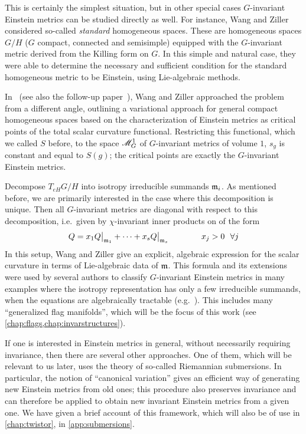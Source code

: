 This is certainly the simplest situation, but in other special cases $G$-invariant Einstein metrics can be studied directly as well. For instance, Wang and Ziller~\cite{WZ1985} considered so-called \emph{standard} homogeneous spaces. These are homogeneous spaces $G/H$ ($G$ compact, connected and semisimple) equipped with the $G$-invariant metric derived from the Killing form on $G$. In this simple and natural case, they were able to determine the necessary and sufficient condition for the standard homogeneous metric to be Einstein, using Lie-algebraic methods. 

In~\cite{WZ1986a} (see also the follow-up paper~\cite{BWZ2004}), Wang and Ziller approached the problem from a different angle, outlining a variational approach for general compact homogeneous spaces based on the characterization of Einstein metrics as critical points of the total scalar curvature functional. Restricting this functional, which we called $S$ before, to the space $\mathscr{M}_G^1$ of $G$-invariant metrics of volume $1$, $s_g$ is constant and equal to $S(g)$; the critical points are exactly the $G$-invariant Einstein metrics.

Decompose $T_{eH}G/H$ into isotropy irreducible summands $\mathfrak{m}_i$. As mentioned before, we are primarily interested in the case where this decomposition is unique. Then all $G$-invariant metrics are diagonal with respect to this decomposition, i.e.~given by $\chi$-invariant inner products on of the form
\begin{equation*}
	Q=x_1 Q\big|_{\mf m_1}+\dots+ x_s Q\big|_{\mf m_s}\qquad \qquad x_j>0\ \ \forall j
\end{equation*}
In this setup, Wang and Ziller give an explicit, algebraic expression for the scalar curvature in terms of Lie-algebraic data of $\mathfrak{m}$. This formula and its extensions were used by several authors to classify $G$-invariant Einstein metrics in many examples where the isotropy representation has only a few irreducible summands, when the equations are algebraically tractable (e.g.~\cite{Ker1996,PS1997,DK2008}). This includes many ``generalized flag manifolds'', which will be the focus of this work (see \cref{chap:flags,chap:invarstructures}).

If one is interested in Einstein metrics in general, without necessarily requiring invariance, then there are several other approaches. One of them, which will be relevant to us later, uses the theory of so-called Riemannian submersions. In particular, the notion of ``canonical variation'' gives an efficient way of generating new Einstein metrics from old ones; this procedure also preserves invariance and can therefore be applied to obtain new invariant Einstein metrics from a given one. We have given a brief account of this framework, which will also be of use in \cref{chap:twistor}, in \cref{app:submersions}.

